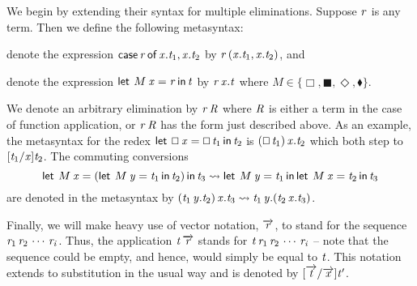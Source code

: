 We begin by extending their syntax for multiple eliminations.  Suppose
$\mathit{r}$ is any term. Then we define the following metasyntax:
\begin{description}
\item denote the expression $ \mathsf{case}\, \mathit{r} \,\mathsf{of}\, \mathit{x} . \mathit{t_{{\mathrm{1}}}} , \mathit{x} . \mathit{t_{{\mathrm{2}}}} $ by $\mathit{r} \,  ( \mathit{x} . \mathit{t_{{\mathrm{1}}}} , \mathit{x} . \mathit{t_{{\mathrm{2}}}} ) $, and
\item denote the expression $ \mathsf{let}\,\mathbin{M}  \mathit{x}  =  \mathit{r} \,\mathsf{in}\, \mathit{t} $ by $\mathit{r} \,  \mathit{x} . \mathit{t} $ where $M \in \{ \Box ,  \blacksquare ,  \Diamond ,  \mathbin{\blacklozenge} \}$.
\end{description}
We denote an arbitrary elimination by $\mathit{r} \, \mathit{R}$ where $\mathit{R}$ is
either a term in the case of function application, or $\mathit{r} \, \mathit{R}$ has
the form just described above.  As an example, the metasyntax for
the redex $ \mathsf{let}\,\oblong  \mathit{x}  =  \oblong \, \mathit{t_{{\mathrm{1}}}} \,\mathsf{in}\, \mathit{t_{{\mathrm{2}}}} $ is $(  \oblong \, \mathit{t_{{\mathrm{1}}}}  ) \,  \mathit{x} . \mathit{t_{{\mathrm{2}}}} $
which both step to $[  \mathit{t_{{\mathrm{1}}}}  /  \mathit{x}  ]  \mathit{t_{{\mathrm{2}}}}$.  The commuting conversions
\[  \mathsf{let}\,\mathbin{M}  \mathit{x}  =  (   \mathsf{let}\,\mathbin{M}  \mathit{y}  =  \mathit{t_{{\mathrm{1}}}} \,\mathsf{in}\, \mathit{t_{{\mathrm{2}}}}   ) \,\mathsf{in}\, \mathit{t_{{\mathrm{3}}}}   \rightsquigarrow   \mathsf{let}\,\mathbin{M}  \mathit{y}  =  \mathit{t_{{\mathrm{1}}}} \,\mathsf{in}\,  \mathsf{let}\,\mathbin{M}  \mathit{x}  =  \mathit{t_{{\mathrm{2}}}} \,\mathsf{in}\, \mathit{t_{{\mathrm{3}}}}   \]
are denoted in the metasyntax by $(  \mathit{t_{{\mathrm{1}}}} \,  \mathit{y} . \mathit{t_{{\mathrm{2}}}}   ) \,  \mathit{x} . \mathit{t_{{\mathrm{3}}}}   \rightsquigarrow  \mathit{t_{{\mathrm{1}}}} \,  \mathit{y} . (  \mathit{t_{{\mathrm{2}}}} \,  \mathit{x} . \mathit{t_{{\mathrm{3}}}}   ) $.

Finally, we will make heavy use of vector notation, $ \overrightarrow{ \mathit{r} } $, to
stand for the sequence $\mathit{r_{{\mathrm{1}}}}\,\mathit{r_{{\mathrm{2}}}}\,\cdots\,\mathit{r_{\mathit{i}}}$.  Thus, the
application $\mathit{t} \,  \overrightarrow{ \mathit{r} } $ stands for
$\mathit{t}\,\mathit{r_{{\mathrm{1}}}}\,\mathit{r_{{\mathrm{2}}}}\,\cdots\,\mathit{r_{\mathit{i}}}$ -- note that the sequence
could be empty, and hence, would simply be equal to $\mathit{t}$.  This
notation extends to substitution in the usual way and is denoted by
$[   \overrightarrow{ \mathit{t} }   /   \overrightarrow{ \mathit{x} }   ]  \mathit{t'}$.

